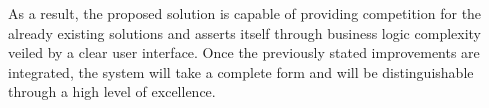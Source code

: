 As a result, the proposed solution is capable of providing competition for the already existing solutions and asserts itself through business logic complexity veiled by a clear user interface. Once the previously stated improvements are integrated, the system will take a complete form and will be distinguishable through a high level of excellence.